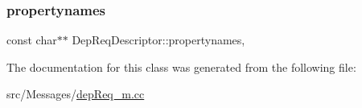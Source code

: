 \subsubsection{\texorpdfstring{propertynames}{propertynames}}
{\footnotesize\ttfamily const char$\ast$$\ast$ Dep\+Req\+Descriptor\+::propertynames\hspace{0.3cm}{\ttfamily [mutable]}, {\ttfamily [private]}}



The documentation for this class was generated from the following file\+:\begin{DoxyCompactItemize}
\item 
src/\+Messages/\hyperlink{dep_req__m_8cc}{dep\+Req\+\_\+m.\+cc}\end{DoxyCompactItemize}
